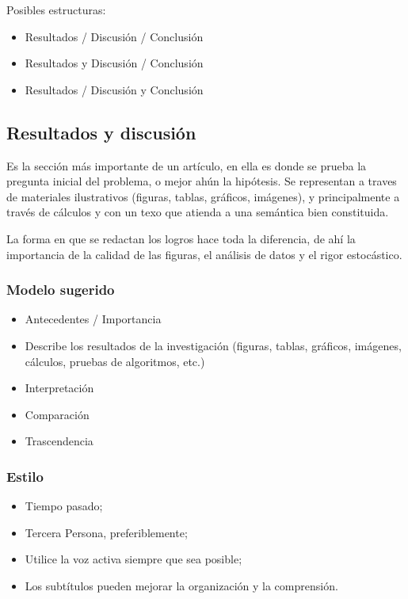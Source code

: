 \documentclass[a4paper,12pt]{article}
\begin{document}
 Posibles estructuras:

\begin{itemize}
    \item Resultados / Discusión / Conclusión
    \item Resultados y Discusión / Conclusión
    \item Resultados / Discusión y Conclusión
\end{itemize}
 
\subsection{Resultados y discusión}
Es la sección más importante de un artículo, en ella es donde  se prueba la pregunta inicial del problema, o mejor ahún la hipótesis. 
Se representan a traves de materiales ilustrativos (figuras, tablas, gráficos, imágenes), y principalmente a través de  cálculos y con un texo que atienda a una semántica bien constituida.

La forma en que se redactan los logros hace toda la diferencia, de ahí la importancia de la calidad de las figuras, el análisis de datos y el rigor estocástico.

\subsubsection{Modelo sugerido}
\begin{itemize}
    \item Antecedentes / Importancia
    \item Describe los resultados de la investigación (figuras, tablas, gráficos, imágenes, cálculos, pruebas de algoritmos, etc.)
    \item Interpretación
    \item Comparación
    \item Trascendencia
\end{itemize}
 
\subsubsection{Estilo}

\begin{itemize}
    \item Tiempo pasado;
    \item Tercera Persona, preferiblemente;
    \item Utilice la voz activa siempre que sea posible;
    \item Los subtítulos pueden mejorar la organización y la comprensión.
\end{itemize}
\end{document}

